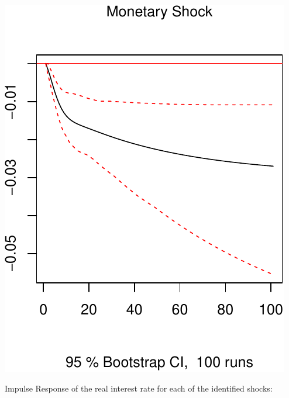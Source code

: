 \documentclass[11pt,preprint, authoryear]{elsarticle}
\numberwithin{equation}{section}
\numberwithin{figure}{section}
\numberwithin{table}{section}
\begin{document}
\includegraphics{TS_proj_files/figure-latex/unnamed-chunk-42-3.pdf}

\newpage

Impulse Response of the real interest rate for each of the identified
shocks:
\end{document}
